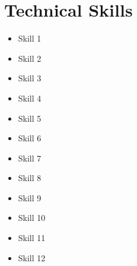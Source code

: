 \section{\faBug \hspace{0.1cm} Technical Skills}
        \begin{multicols}{3}
            \begin{itemize}[itemsep=-3pt, parsep=3pt]
                \item\small Skill 1
                \item Skill 2
                \item Skill 3
                \item Skill 4
                \item Skill 5
                \item Skill 6
                \item Skill 7
                \item Skill 8
                \item Skill 9
                \item Skill 10
                \item Skill 11
                \item Skill 12
            \end{itemize}
        \end{multicols}
        \vspace*{2.0\multicolsep}

\vspace{1pt}

